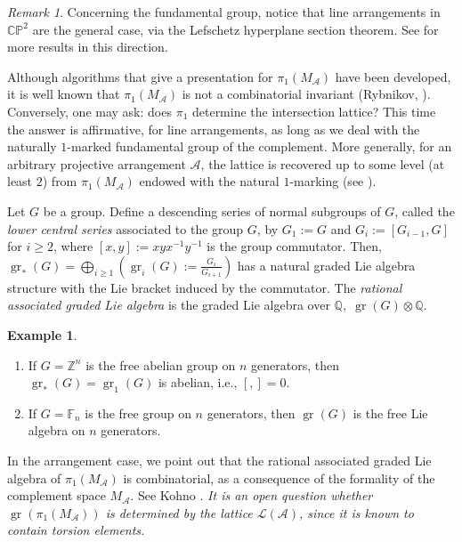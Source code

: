 \documentclass[psamsfonts]{conm-p-l}
\theoremstyle{definition}
\newtheorem{example}[theorem]{Example}
\theoremstyle{remark}
\newtheorem{remark}[theorem]{Remark}
\numberwithin{equation}{section}
\newcommand{\A}{{\mathcal A}}
\newcommand{\Z}{\mathbb{Z}}
\newcommand{\Q}{\mathbb{Q}}
\newcommand{\C}{\mathbb{C}}
\newcommand{\F}{\mathbb{F}}
\newcommand{\p}{\mathbb{P}}
\DeclareMathOperator{\gr}{gr}
\begin{document}
\begin{remark}
\label{lefschetz}
Concerning the fundamental group, notice that line arrangements in $\C\p^2$ are the general case, 
via the Lefschetz hyperplane section theorem. See \cite{DP} for more results in
this direction.
\end{remark}

Although algorithms that give a presentation for $\pi_1(M_{\A})$ have been developed, 
it is well known that $\pi_1(M_{\A})$ is not a combinatorial invariant (Rybnikov, \cite{Ryb}). 
Conversely, one may ask: does $\pi_1$ determine the intersection lattice?
This time the answer is affirmative, for line arrangements, as long as we deal with
the naturally $1$-marked  fundamental group of the complement. 
More generally, for an arbitrary projective arrangement $\A$, the lattice is recovered 
up to some level (at least $2$) from $\pi_1(M_{\A})$ endowed with the natural
$1$-marking (see \cite[Theorem 2.1]{CDP}).

 Let $G$ be a group. Define a descending series of normal subgroups of $G$, called the
 {\it lower central series} associated to the group $G$, by $G_1:=G$ and 
 $G_i:=[G_{i-1},G]$ for $i \geq 2$, where $[x,y]:= xyx^{-1}y^{-1}$ is the group commutator.
 Then, $\gr_*(G) =\bigoplus_{i \geq 1} (\gr_i(G):= \frac{G_i}{G_{i+1}})$ has a natural 
 graded Lie algebra structure with the Lie bracket induced by the commutator. The
 {\it rational associated graded Lie algebra} is  the graded 
 Lie algebra over $\Q,\; \gr(G) \otimes \Q$.

\begin{example}
\label{lie}
\begin{enumerate}
\item \label{Zn}
If $G=\Z^n$ is the free abelian  group on $n$ generators, then $\gr_*(G)=\gr_1(G)$ is
abelian, i.e., $[,]=0$.
\item \label{Fn}
If $G=\F_n$ is the free group on $n$ generators, then $\gr(G)$ is the
free Lie algebra on $n$ generators.
\end{enumerate}
\end{example}

In the arrangement case, we point out that the rational 
associated graded Lie algebra of $\pi_1(M_{\A})$ is combinatorial, 
as a consequence of the formality of the complement space $M_{\A}$. See Kohno \cite{Ko}.
{\it It is an open question whether $\gr(\pi_1(M_{\A}))$ is determined by the lattice $\mathcal L(\A)$,
since it is known to contain  torsion elements.}
 
\end{document}
